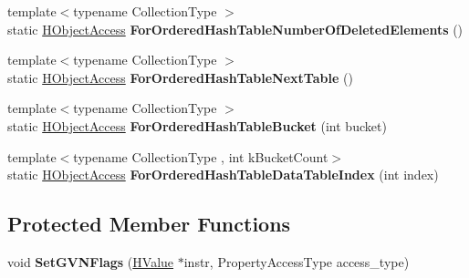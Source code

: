 \begin{DoxyCompactItemize}
\item 
{\footnotesize template$<$typename Collection\+Type $>$ }\\static \hyperlink{classv8_1_1internal_1_1_h_object_access}{H\+Object\+Access} {\bfseries For\+Ordered\+Hash\+Table\+Number\+Of\+Deleted\+Elements} ()\hypertarget{classv8_1_1internal_1_1_h_object_access_abff467099c58b6e6db70ceb4554e4d62}{}\label{classv8_1_1internal_1_1_h_object_access_abff467099c58b6e6db70ceb4554e4d62}

\item 
{\footnotesize template$<$typename Collection\+Type $>$ }\\static \hyperlink{classv8_1_1internal_1_1_h_object_access}{H\+Object\+Access} {\bfseries For\+Ordered\+Hash\+Table\+Next\+Table} ()\hypertarget{classv8_1_1internal_1_1_h_object_access_a67e1b36060f78a727dd28aaf7d8f3c53}{}\label{classv8_1_1internal_1_1_h_object_access_a67e1b36060f78a727dd28aaf7d8f3c53}

\item 
{\footnotesize template$<$typename Collection\+Type $>$ }\\static \hyperlink{classv8_1_1internal_1_1_h_object_access}{H\+Object\+Access} {\bfseries For\+Ordered\+Hash\+Table\+Bucket} (int bucket)\hypertarget{classv8_1_1internal_1_1_h_object_access_a7e16149e2eb7d6a625f59655256422fa}{}\label{classv8_1_1internal_1_1_h_object_access_a7e16149e2eb7d6a625f59655256422fa}

\item 
{\footnotesize template$<$typename Collection\+Type , int k\+Bucket\+Count$>$ }\\static \hyperlink{classv8_1_1internal_1_1_h_object_access}{H\+Object\+Access} {\bfseries For\+Ordered\+Hash\+Table\+Data\+Table\+Index} (int index)\hypertarget{classv8_1_1internal_1_1_h_object_access_a30c6a568ddefa3f740b630c6834effa4}{}\label{classv8_1_1internal_1_1_h_object_access_a30c6a568ddefa3f740b630c6834effa4}

\end{DoxyCompactItemize}
\subsection*{Protected Member Functions}
\begin{DoxyCompactItemize}
\item 
void {\bfseries Set\+G\+V\+N\+Flags} (\hyperlink{classv8_1_1internal_1_1_h_value}{H\+Value} $\ast$instr, Property\+Access\+Type access\+\_\+type)\hypertarget{classv8_1_1internal_1_1_h_object_access_a7005fcb9c99cf155600971458f20c114}{}\label{classv8_1_1internal_1_1_h_object_access_a7005fcb9c99cf155600971458f20c114}

\end{DoxyCompactItemize}
